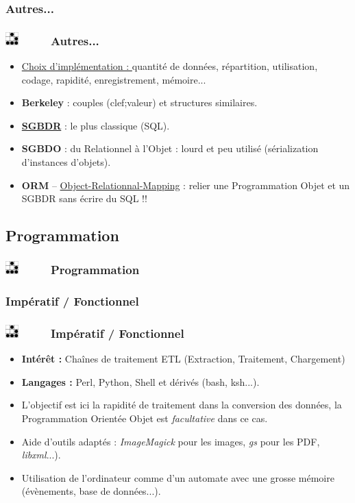 \documentclass[slidetop,11pt]{beamer}
\def\sectionPartIbTR{Autres...}
\def\sectionPartIc{Programmation}
\def\sectionPartIcUN{Imp{\'e}ratif / Fonctionnel}
\def\moreInFrameTitle{\includegraphics[height=0.5cm]{img/logo_glider.png}~~~~~}
\begin{document}
\subsubsection{\sectionPartIbTR}
\begin{frame}
	\frametitle{\moreInFrameTitle \sectionPartIbTR}
	\begin{itemize}	
		\item \underline{Choix d'impl{\'e}mentation : } quantit{\'e} de donn{\'e}es, r{\'e}partition, utilisation, codage, rapidit{\'e}, enregistrement, m{\'e}moire...
		\item \textbf{Berkeley} : couples (clef;valeur) et structures similaires. 
		\item \textbf{\underline{SGBDR}} : le plus classique (SQL). 
		\item \textbf{SGBDO} : du Relationnel {\`a} l'Objet : lourd et peu utilis{\'e} (s{\'e}rialization d'instances d'objets). 
		\item \textbf{ORM} -- \underline{Object-Relationnal-Mapping} : relier une Programmation Objet et un SGBDR sans {\'e}crire du SQL !!
	\end{itemize}
\end{frame} 


\subsection{\sectionPartIc}
\begin{frame}
	\frametitle{\moreInFrameTitle \sectionPartIc}
	\tableofcontents[sections=2,subsectionstyle=show/shaded/hide,subsubsectionstyle=show/show/hide]
\end{frame} 

\subsubsection{\sectionPartIcUN}
\begin{frame}
	\frametitle{\moreInFrameTitle \sectionPartIcUN}
	\begin{itemize}	
		\item \textbf{Int{\'e}r{\^e}t : } Cha{\^i}nes de traitement ETL (Extraction, Traitement, Chargement)
		\item \textbf{Langages : } Perl, Python, Shell et d{\'e}riv{\'e}s (bash, ksh...). 
		\item L'objectif est ici la rapidit{\'e} de traitement dans la conversion des donn{\'e}es, la Programmation Orient{\'e}e Objet est \emph{facultative} dans ce cas. 
		\item Aide d'outils adapt{\'e}s : \emph{ImageMagick} pour les images, \emph{gs} pour les PDF, \emph{libxml}...). 
		\item Utilisation de l'ordinateur comme d'un automate avec une grosse m{\'e}moire ({\'e}v{\`e}nements, base de donn{\'e}es...). 
	\end{itemize}
\end{frame} 
\end{document}
